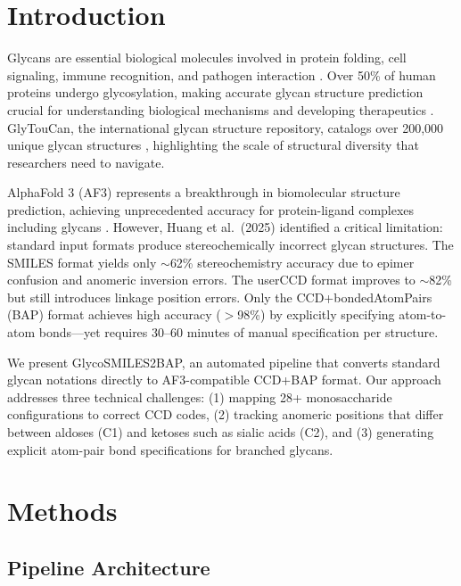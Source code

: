 \section{Introduction}

Glycans are essential biological molecules involved in protein folding, cell signaling, immune recognition, and pathogen interaction \citep{varki2017}. Over 50\% of human proteins undergo glycosylation, making accurate glycan structure prediction crucial for understanding biological mechanisms and developing therapeutics \citep{helenius2004}. GlyTouCan, the international glycan structure repository, catalogs over 200,000 unique glycan structures \citep{tiemeyer2016}, highlighting the scale of structural diversity that researchers need to navigate.

AlphaFold 3 (AF3) represents a breakthrough in biomolecular structure prediction, achieving unprecedented accuracy for protein-ligand complexes including glycans \citep{abramson2024}. However, Huang et al.\ (2025) identified a critical limitation: standard input formats produce stereochemically incorrect glycan structures. The SMILES format yields only $\sim$62\% stereochemistry accuracy due to epimer confusion and anomeric inversion errors. The userCCD format improves to $\sim$82\% but still introduces linkage position errors. Only the CCD+bondedAtomPairs (BAP) format achieves high accuracy ($>$98\%) by explicitly specifying atom-to-atom bonds---yet requires 30--60 minutes of manual specification per structure.

We present GlycoSMILES2BAP, an automated pipeline that converts standard glycan notations directly to AF3-compatible CCD+BAP format. Our approach addresses three technical challenges: (1) mapping 28+ monosaccharide configurations to correct CCD codes, (2) tracking anomeric positions that differ between aldoses (C1) and ketoses such as sialic acids (C2), and (3) generating explicit atom-pair bond specifications for branched glycans.

\section{Methods}

\subsection{Pipeline Architecture}

